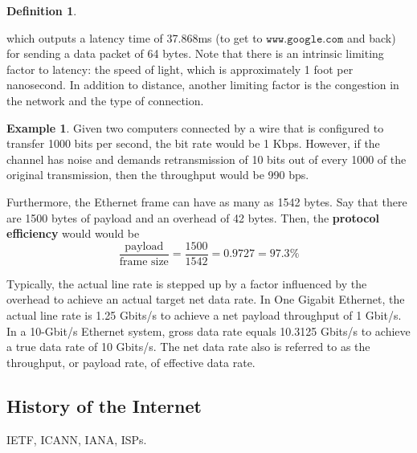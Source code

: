 \documentclass{article}
\theoremstyle{definition}
\newtheorem{example}{Example}[section]
\newtheorem{definition}{Definition}[section]
\begin{document}
\begin{definition}
\begin{enumerate}
        which outputs a latency time of 37.868ms (to get to $\texttt{www.google.com}$ and back) for sending a data packet of 64 bytes. Note that there is an intrinsic limiting factor to latency: the speed of light, which is approximately 1 foot per nanosecond. In addition to distance, another limiting factor is the congestion in the network and the type of connection. 
      \end{enumerate}
    \end{definition}

    \begin{example}
    Given two computers connected by a wire that is configured to transfer 1000 bits per second, the bit rate would be 1 Kbps. However, if the channel has noise and demands retransmission of 10 bits out of every 1000 of the original transmission, then the throughput would be 990 bps. 

    Furthermore, the Ethernet frame can have as many as 1542 bytes. Say that there are 1500 bytes of payload and an overhead of 42 bytes. Then, the \textbf{protocol efficiency} would would be 
    \[\frac{\text{payload}}{\text{frame size}} = \frac{1500}{1542} = 0.9727 = 97.3\%\]
    \end{example}

    Typically, the actual line rate is stepped up by a factor influenced by the overhead to achieve an actual target net data rate. In One Gigabit Ethernet, the actual line rate is 1.25 Gbits/s to achieve a net payload throughput of 1 Gbit/s. In a 10-Gbit/s Ethernet system, gross data rate equals 10.3125 Gbits/s to achieve a true data rate of 10 Gbits/s. The net data rate also is referred to as the throughput, or payload rate, of effective data rate.

  \subsection{History of the Internet}

    IETF, ICANN, IANA, ISPs.  
\end{document}
